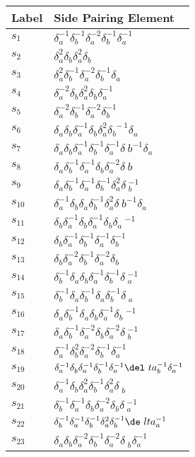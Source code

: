 \documentclass{article}
\begin{document}
\begin{center}
\begin{tabular}{ll}
\bottomrule
\end{tabular}
\hfill
\begin{tabular}{ll}
\toprule
Label & Side Pairing Element\\
\midrule
$s_{1}$ & $\delta_a^{-1}\delta_b^{-1}\delta_a^{-2}\delta_b^{-1}\delta_a^{-1}$ \\
$s_{2}$ & $\delta_a^{2}\delta_b^{}\delta_a^{2}\delta_b^{}$ \\
$s_{3}$ & $\delta_a^{2}\delta_b^{-1}\delta_a^{-2}\delta_b^{-1}\delta_a^{}$ \\
$s_{4}$ & $\delta_a^{-2}\delta_b^{}\delta_a^{2}\delta_b^{}\delta_a^{-1}$ \\
$s_{5}$ & $\delta_a^{-2}\delta_b^{-1}\delta_a^{-2}\delta_b^{-1}$ \\
$s_{6}$ & $\delta_a^{}\delta_b^{}\delta_a^{-1}\delta_b^{}\delta_a^{2}\delta_b^{\
-1}\delta_a^{}$ \\
$s_{7}$ & $\delta_a^{}\delta_b^{}\delta_a^{-1}\delta_b^{-1}\delta_a^{-1}\delta_\
b^{-1}\delta_a^{}$ \\
$s_{8}$ & $\delta_a^{}\delta_b^{-1}\delta_a^{-1}\delta_b^{}\delta_a^{-2}\delta_\
b^{}$ \\
$s_{9}$ & $\delta_a^{}\delta_b^{-1}\delta_a^{-1}\delta_b^{-1}\delta_a^{2}\delta\
_b^{-1}$ \\
$s_{10}$ & $\delta_a^{-1}\delta_b^{}\delta_a^{}\delta_b^{-1}\delta_a^{2}\delta_\
b^{-1}\delta_a^{}$ \\
$s_{11}$ & $\delta_b^{}\delta_a^{-1}\delta_b^{}\delta_a^{-1}\delta_b^{}\delta_a\
^{-1}$ \\
$s_{12}$ & $\delta_b^{}\delta_a^{-1}\delta_b^{-1}\delta_a^{-1}\delta_b^{-1}$ \\
$s_{13}$ & $\delta_b^{}\delta_a^{-2}\delta_b^{-1}\delta_a^{-2}\delta_b^{}$ \\
$s_{14}$ & $\delta_b^{-1}\delta_a^{}\delta_b^{}\delta_a^{-1}\delta_b^{-1}\delta\
_a^{-1}$ \\
$s_{15}$ & $\delta_b^{-1}\delta_a^{}\delta_b^{-1}\delta_a^{}\delta_b^{-1}\delta\
_a^{}$ \\
$s_{16}$ & $\delta_a^{}\delta_b^{-1}\delta_a^{}\delta_b^{}\delta_a^{-1}\delta_b\
^{-1}$ \\
$s_{17}$ & $\delta_a^{}\delta_b^{-1}\delta_a^{-2}\delta_b^{}\delta_a^{-2}\delta\
_b^{-1}$ \\
$s_{18}$ & $\delta_a^{-1}\delta_b^{2}\delta_a^{-2}\delta_b^{-1}\delta_a^{-1}$ \\
$s_{19}$ & $\delta_a^{-1}\delta_b^{}\delta_a^{-1}\delta_b^{-1}\delta_a^{-1}\del\
ta_b^{-1}\delta_a^{-1}$ \\
$s_{20}$ & $\delta_a^{-1}\delta_b^{}\delta_a^{2}\delta_b^{-1}\delta_a^{2}\delta\
_b^{}$ \\
$s_{21}$ & $\delta_b^{-1}\delta_a^{-1}\delta_b^{}\delta_a^{-2}\delta_b^{}\delta\
_a^{-1}$ \\
$s_{22}$ & $\delta_b^{-1}\delta_a^{-1}\delta_b^{-1}\delta_a^{2}\delta_b^{-1}\de\
lta_a^{-1}$ \\
$s_{23}$ & $\delta_a^{}\delta_b^{}\delta_a^{-2}\delta_b^{-1}\delta_a^{-2}\delta\
_b^{}\delta_a^{-1}$ \\
\bottomrule
\end{tabular}
\end{center}

\thispagestyle{empty}
\end{document}
